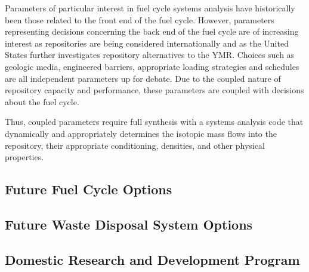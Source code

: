 
Parameters of particular interest in fuel cycle systems analysis have 
historically been those related to the front end of the fuel cycle.  However, 
parameters representing decisions concerning the back end of the fuel cycle are 
of increasing interest as repositories are being considered internationally and 
as the United States further investigates repository alternatives to the 
\gls{YMR}.  Choices such as geologic media, engineered barriers, 
appropriate loading strategies and schedules are all independent parameters up 
for debate. Due to the coupled nature of repository capacity and 
performance, these parameters are coupled with decisions about the fuel cycle. 


Thus, coupled parameters require full synthesis with a systems analysis code 
that dynamically and appropriately determines the isotopic mass flows into the 
repository, their appropriate conditioning, densities, and other physical 
properties.  

\subsection{Future Fuel Cycle Options}

\subsection{Future Waste Disposal System Options}

\subsection{Domestic Research and Development Program}


